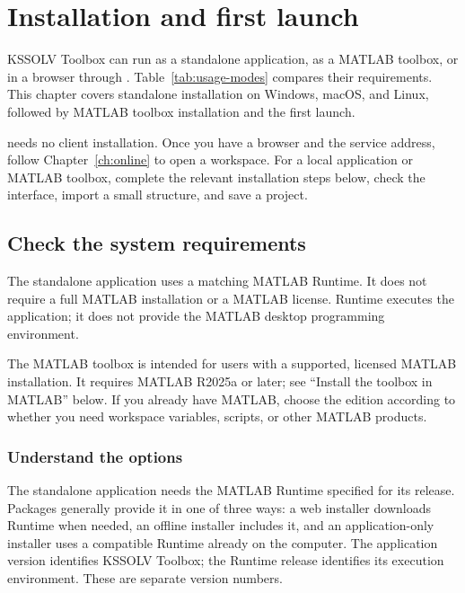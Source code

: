 \chapter{Installation and first launch}\label{ch:install}

KSSOLV Toolbox can run as a standalone application, as a MATLAB\regmark{} toolbox, or in a browser through \ksonline{}. Table~\ref{tab:usage-modes} compares their requirements. This chapter covers standalone installation on Windows, macOS, and Linux, followed by MATLAB\regmark{} toolbox installation and the first launch.

\ksonline{} needs no client installation. Once you have a browser and the service address, follow Chapter~\ref{ch:online} to open a workspace. For a local application or MATLAB\regmark{} toolbox, complete the relevant installation steps below, check the interface, import a small structure, and save a project.

\section{Check the system requirements}

The standalone application uses a matching MATLAB\regmark{} Runtime. It does not require a full MATLAB\regmark{} installation or a MATLAB\regmark{} license. Runtime executes the application; it does not provide the MATLAB\regmark{} desktop programming environment.

The MATLAB\regmark{} toolbox is intended for users with a supported, licensed MATLAB\regmark{} installation. It requires MATLAB\regmark{} R2025a or later; see ``Install the toolbox in MATLAB\regmark{}'' below. If you already have MATLAB\regmark{}, choose the edition according to whether you need workspace variables, scripts, or other MATLAB\regmark{} products.

\subsection{Understand the  options}

The standalone application needs the MATLAB\regmark{} Runtime specified for its release. Packages generally provide it in one of three ways: a web installer downloads Runtime when needed, an offline installer includes it, and an application-only installer uses a compatible Runtime already on the computer. The application version identifies KSSOLV Toolbox; the Runtime release identifies its execution environment. These are separate version numbers.

